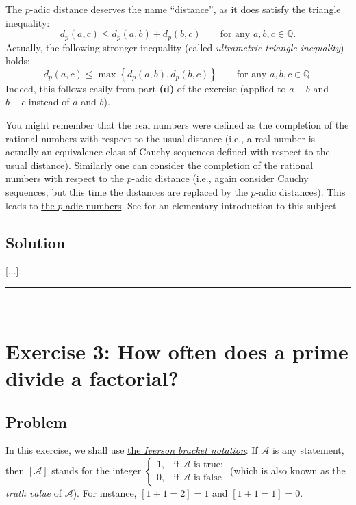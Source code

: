 \documentclass[paper=a4, fontsize=12pt]{scrartcl} %
\newcommand{\QQ}{\mathbb{Q}} %
\newcommand{\set}[1]{\left\{ #1 \right\}}
\newcommand{\tup}[1]{\left( #1 \right)}
\newcommand{\ive}[1]{\left[ #1 \right]}
\newcommand{\horrule}[1]{\rule{\linewidth}{#1}} %
\theoremstyle{plainsl}
\theoremstyle{definition}
\theoremstyle{remark}
\begin{document}
The $p$-adic distance deserves the name ``distance'', as it
does satisfy the triangle inequality:
\[
d_p\tup{a, c} \leq d_p\tup{a, b} + d_p\tup{b, c}
\qquad \text{for any $a, b, c \in \QQ$} .
\]
Actually, the following stronger inequality (called
\textit{ultrametric triangle inequality}) holds:
\[
d_p\tup{a, c} \leq \max\set{d_p\tup{a, b}, d_p\tup{b, c}}
\qquad \text{for any $a, b, c \in \QQ$} .
\]
Indeed, this follows easily from part \textbf{(d)} of the
exercise (applied to $a-b$ and $b-c$ instead of $a$ and $b$).

You might remember that the real numbers were defined as the
completion of the rational numbers with respect to the usual
distance (i.e., a real number is actually an equivalence class
of Cauchy sequences defined with respect to the usual distance).
Similarly one can consider the completion of the rational numbers
with respect to the $p$-adic distance (i.e., again consider
Cauchy sequences, but this time the distances are replaced by
the $p$-adic distances).
This leads to \href{https://en.wikipedia.org/wiki/P-adic_number}{the $p$-adic numbers}.
See \cite{Gouvea97} for an elementary introduction to this
subject.

\subsection{Solution}

[...]

\horrule{0.3pt} \\[0.4cm]

\section{Exercise 3: How often does a prime divide a factorial?}

\subsection{Problem}

In this exercise, we shall use
\href{https://en.wikipedia.org/wiki/Iverson_bracket}{the \textit{Iverson bracket notation}}:
If $\mathcal{A}$ is any statement, then $\ive{\mathcal{A}}$
stands for the integer
$\begin{cases}
1, & \text{if $\mathcal{A}$ is true;} \\
0, & \text{if $\mathcal{A}$ is false}
\end{cases}$
(which is also known as the \textit{truth value} of
$\mathcal{A}$).
For instance, $\ive{1+1 = 2} = 1$ and $\ive{1+1 = 1} = 0$.
\end{document}
